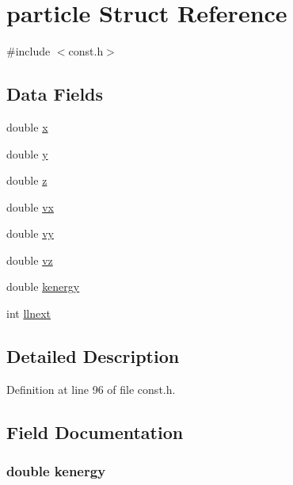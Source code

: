 \hypertarget{structparticle}{}\section{particle Struct Reference}
\label{structparticle}


{\ttfamily \#include $<$const.\+h$>$}

\subsection*{Data Fields}
\begin{DoxyCompactItemize}
\item 
double \hyperlink{structparticle_af88b946fb90d5f08b5fb740c70e98c10}{x}
\item 
double \hyperlink{structparticle_ab927965981178aa1fba979a37168db2a}{y}
\item 
double \hyperlink{structparticle_ab3e6ed577a7c669c19de1f9c1b46c872}{z}
\item 
double \hyperlink{structparticle_a2d31cc80a747457c212675a58c68b2b1}{vx}
\item 
double \hyperlink{structparticle_a42e75115788e629a258d041808d822a0}{vy}
\item 
double \hyperlink{structparticle_a7eddee930e55c61ba8cd3506c1ac5fc1}{vz}
\item 
double \hyperlink{structparticle_a3e9e917268aa92da937e895d5ac9b693}{kenergy}
\item 
int \hyperlink{structparticle_a249c9992214ca0e4e230f9f494b42cb9}{llnext}
\end{DoxyCompactItemize}


\subsection{Detailed Description}


Definition at line 96 of file const.\+h.



\subsection{Field Documentation}
\hypertarget{structparticle_a3e9e917268aa92da937e895d5ac9b693}{}
\subsubsection[{kenergy}]{\setlength{\rightskip}{0pt plus 5cm}double kenergy}\label{structparticle_a3e9e917268aa92da937e895d5ac9b693}


